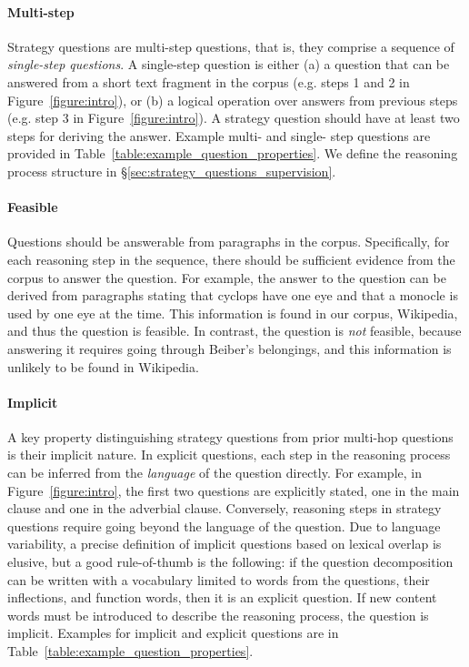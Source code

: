 {\paragraph{Multi-step} 
Strategy questions are multi-step questions, that is, they comprise a sequence of \emph{single-step questions}. A single-step question is either (a) a question that can be answered from a short text fragment in the corpus (e.g. steps 1 and 2 in Figure~\ref{figure:intro}), or (b) a logical operation over answers from previous steps (e.g. step 3 in Figure~\ref{figure:intro}). A strategy question should have at least two steps for deriving the answer. Example multi- and single- step questions are provided in Table~\ref{table:example_question_properties}.
We define the reasoning process structure in \S\ref{sec:strategy_questions_supervision}.

\paragraph{Feasible}
Questions should be answerable from paragraphs in the corpus. Specifically, for each reasoning step in the sequence, there should be sufficient evidence from the corpus to answer the question.
For example, the answer to the question  can be derived from paragraphs stating that cyclops have one eye and that a monocle is used by one eye at the time. This information is found in our corpus, Wikipedia, and thus the question is feasible.
In contrast, the question  is \emph{not} feasible, because answering it requires going through Beiber's belongings, and this information is unlikely to be found in Wikipedia.

\paragraph{Implicit} A key property distinguishing strategy questions from prior multi-hop questions is their implicit nature.
In explicit questions, each step in the reasoning process can be inferred from the \emph{language} of the question directly. For example, in Figure~\ref{figure:intro}, the first two questions are explicitly stated, one in the main clause and one in the adverbial clause. Conversely, reasoning steps in strategy questions require going beyond the language of the question. Due to language variability, a precise definition of implicit questions based on lexical overlap is elusive, but a good rule-of-thumb is the following: if the question decomposition can be written with a vocabulary limited to words from the questions, their inflections, and function words, then it is an explicit question. If new content words must be introduced to describe the reasoning process, the question is implicit.
Examples for implicit and explicit questions are in Table~\ref{table:example_question_properties}.

}

